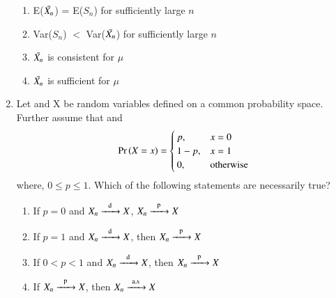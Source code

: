 \begin{enumerate}[label=\thesection.\arabic*.,ref=\thesection.\theenumi]
\begin{enumerate}
    \item E($\Bar{X_{n}}$) = E($S_{n}$) for sufficiently large $n$
    \label{conv/3/option 1}
    \item Var($S_{n}$) $<$ Var($\Bar{X_{n}}$) for sufficiently large $n$
    \label{conv/3/option 2}
    \item $\Bar{X_{n}}$ is consistent for $\mu$
    \label{conv/3/option 3}
    \item $\Bar{X_{n}}$ is sufficient for $\mu$
    \label{conv/3/option 4}
\end{enumerate}
%
\solution

%
\item Let  and X be random variables defined on a common probability space. Further assume that  and
\begin{align}
\Pr\left(X = x\right) =\begin{cases}
   p, & x = 0  \\
   1-p, & x =1 \\
    0, &\text{otherwise} 
\end{cases}\end{align}
where, $0 \leq p \leq 1$. Which of the following statements are necessarily true?
\begin{enumerate}
   \item If $p = 0$ and $X_n \ce{->[d]} X$, $X_n \ce{->[p]} X$ 
   \item If $p = 1$ and $X_n \ce{->[d]} X$, then $X_n  \ce{->[p]} X$
   \item If $0<p<1$ and $X_n \ce{->[d]} X$, then $X_n \ce{->[p]} X$
   \item If $X_n \ce{->[p]} X$, then $X_n  \ce{->T[a.s]} X$
\end{enumerate}
\solution



%
% 



\end{enumerate}
